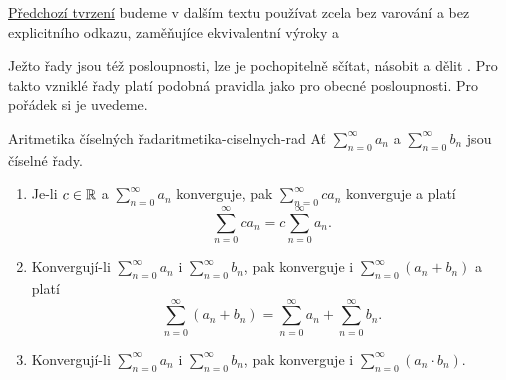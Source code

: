 \hyperref[prop:vztah-konvergence-a-existence-souctu]{Předchozí tvrzení} budeme v
dalším textu používat zcela bez varování a bez explicitního odkazu, zaměňujíce
ekvivalentní výroky  a 

Ježto řady jsou též posloupnosti, lze je pochopitelně sčítat, násobit a dělit
. Pro takto vzniklé řady platí podobná pravidla jako pro
obecné posloupnosti. Pro pořádek si je uvedeme.

\begin{proposition}{Aritmetika číselných řad}{aritmetika-ciselnych-rad}
 Ať $\sum_{n=0}^{\infty} a_n$ a $\sum_{n=0}^{\infty} b_n$ jsou číselné řady.
 \begin{enumerate}
  \item Je-li $c \in \mathbb{R}$ a $\sum_{n=0}^{\infty} a_n$ konverguje, pak
   $\sum_{n=0}^{\infty} c a_n$ konverguje a platí
   \[
    \sum_{n=0}^{\infty} ca_n = c \sum_{n=0}^{\infty} a_n.
   \]
  \item Konvergují-li $\sum_{n=0}^{\infty} a_n$ i $\sum_{n=0}^{\infty} b_n$, pak
   konverguje i $\sum_{n=0}^{\infty} (a_n + b_n)$ a platí
   \[
    \sum_{n=0}^{\infty} (a_n + b_n) = \sum_{n=0}^{\infty} a_n +
    \sum_{n=0}^{\infty} b_n.
   \]
  \item Konvergují-li $\sum_{n=0}^{\infty} a_n$ i $\sum_{n=0}^{\infty} b_n$, pak
   konverguje i $\sum_{n=0}^{\infty} (a_n \cdot b_n)$.
 \end{enumerate}
\end{proposition}

